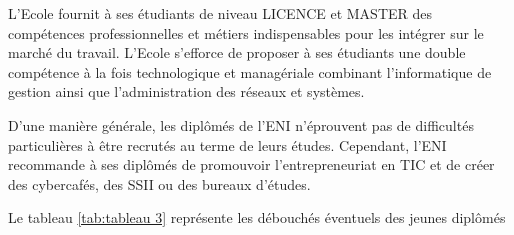 \documentclass[12pt]{report}
\begin{document}
				L’Ecole fournit à ses étudiants de niveau LICENCE et MASTER des compétences professionnelles et métiers indispensables pour les intégrer sur le marché du travail. 
L’Ecole s’efforce de proposer à ses étudiants une double compétence à la fois technologique et managériale combinant l’informatique de gestion ainsi que l’administration des réseaux et systèmes.

				D’une manière générale, les diplômés de l’ENI n’éprouvent pas de difficultés particulières à être recrutés au terme de leurs études. Cependant, l’ENI recommande à ses diplômés de promouvoir l’entrepreneuriat en TIC et de créer des cybercafés, des SSII ou des bureaux d’études.

				Le tableau \ref{tab:tableau 3} représente les débouchés éventuels des jeunes diplômés

				\begin{table}[h]
				  \centering
				  \caption{Débouchés éventuels des jeunes diplômés}
				  \label{tab:tableau 3}
\end{table}
\end{document}
